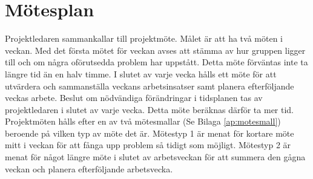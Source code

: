 \section{Mötesplan}

Projektledaren sammankallar till projektmöte. Målet är att ha två möten i veckan. Med det första mötet för veckan avses att stämma av hur gruppen ligger till och om några oförutsedda problem har uppstått. Detta möte förväntas inte ta längre tid än en halv timme. I slutet av varje vecka hålls ett möte för att utvärdera och sammanställa veckans arbetsinsatser samt planera efterföljande veckas arbete. Beslut om nödvändiga förändringar i tidsplanen tas av projektledaren i slutet av varje vecka. Detta möte beräknas därför ta mer tid. \\
Projektmöten hålls efter en av två mötesmallar (Se Bilaga \ref{ap:motesmall}) beroende på vilken typ av möte det är. Mötestyp 1 är menat för kortare möte mitt i veckan för att fånga upp problem så tidigt som möjligt. Mötestyp 2 är menat för något längre möte i slutet av arbetsveckan för att summera den gågna veckan och planera efterföljande arbetsvecka.
